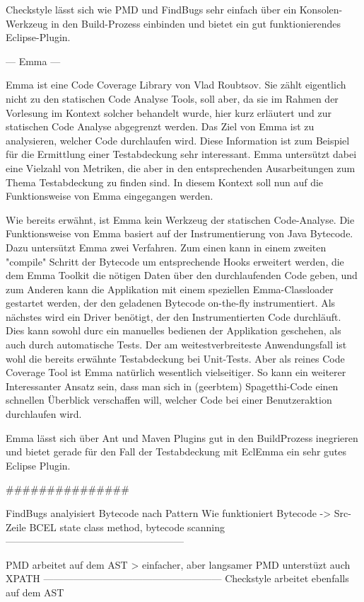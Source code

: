 Checkstyle lässt sich wie PMD und FindBugs sehr einfach über ein Konsolen-Werkzeug in den Build-Prozess einbinden und bietet ein gut funktionierendes Eclipse-Plugin.


--- Emma ---

Emma ist eine Code Coverage Library von Vlad Roubtsov. Sie zählt eigentlich nicht zu den statischen Code Analyse Tools, soll aber, da sie im Rahmen der Vorlesung im Kontext solcher behandelt wurde, hier kurz erläutert und zur statischen Code Analyse abgegrenzt werden. 
Das Ziel von Emma ist zu analysieren, welcher Code durchlaufen wird. Diese Information ist zum Beispiel für die Ermittlung einer Testabdeckung sehr interessant. Emma untersützt dabei eine Vielzahl von Metriken, die aber in den entsprechenden Ausarbeitungen zum Thema Testabdeckung zu finden sind. In diesem Kontext soll nun auf die Funktionsweise von Emma eingegangen werden.

Wie bereits erwähnt, ist Emma kein Werkzeug der statischen Code-Analyse. Die Funktionsweise von Emma basiert auf der Instrumentierung von Java Bytecode. Dazu untersützt Emma zwei Verfahren. Zum einen kann in einem zweiten "compile" Schritt der Bytecode um entsprechende Hooks erweitert werden, die dem Emma Toolkit die nötigen Daten über den durchlaufenden Code geben, und zum Anderen kann die Applikation mit einem speziellen Emma-Classloader gestartet werden, der den geladenen Bytecode on-the-fly instrumentiert. Als nächstes wird ein Driver benötigt, der den Instrumentierten Code durchläuft. Dies kann sowohl durc ein manuelles bedienen der Applikation geschehen, als auch durch automatische Tests. Der am weitestverbreiteste Anwendungsfall ist wohl die bereits erwähnte Testabdeckung bei Unit-Tests. Aber als reines Code Coverage Tool ist Emma natürlich wesentlich vielseitiger. So kann ein weiterer Interessanter Ansatz sein, dass man sich in (geerbtem) Spagetthi-Code einen schnellen Überblick verschaffen will, welcher Code bei einer Benutzeraktion durchlaufen wird.

Emma lässt sich über Ant und Maven Plugins gut in den BuildProzess inegrieren und bietet gerade für den Fall der Testabdeckung mit EclEmma ein sehr gutes Eclipse Plugin.

###############

FindBugs analyisiert Bytecode nach Pattern
Wie funktioniert Bytecode -> Src-Zeile
BCEL
state class method, bytecode scanning
------------------------------------------------------

PMD arbeitet auf dem AST > einfacher, aber langsamer
PMD unterstüzt auch XPATH
------------------------------------------------------
Checkstyle arbeitet ebenfalls auf dem AST


